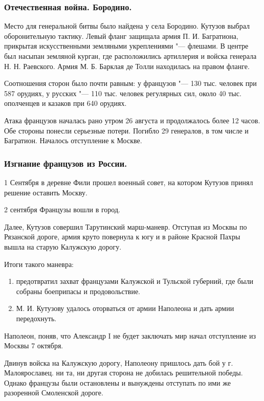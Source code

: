 \subsubsection{Отечественная война. Бородино.}

Место для генеральной битвы было найдена у села Бородино. Кутузов выбрал оборонительную тактику. Левый фланг защищала армия П. И. Багратиона, прикрытая искусственными земляными укреплениями "--- флешами. В центре был насыпан земляной курган, где расположились артиллерия и войска генерала Н. Н. Раевского. Армия М. Б. Барклая де Толли находилась на правом фланге.

Соотношения сторон было почти равным: у французов "--- 130 тыс. человек при 587 орудиях, у русских "--- 110 тыс. человек регулярных сил, около 40 тыс. ополченцев и казаков при 640 орудиях.

Атака французов началась рано утром 26 августа и продолжалось более 12 часов. Обе стороны понесли серьезные потери. Погибло 29 генералов, в том числе и Багратион. Началось отступление к Москве.

\subsubsection{Изгнание французов из России.}

1 Сентября в деревне Фили прошел военный совет, на котором Кутузов принял решение оставить Москву.

2 сентября Французы вошли в город.

Далее, Кутузов совершил Тарутинский марш-маневр. Отступая из Москвы по Рязанской дороге, армия круто повернула к югу и в районе Красной Пахры вышла на старую Калужскую дорогу.

Итоги такого маневра:

\begin{enumerate}
    \item{ предотвратил захват французами Калужской и Тульской губерний, где были собраны боеприпасы и продовольствие. }
    \item{ М. И. Кутузову удалось оторваться от армии Наполеона и дать армии передохнуть. }
\end{enumerate}

Наполеон, поняв, что Александр I не будет заключать мир начал отступление из Москвы 7 октября.

Двинув войска на Калужскую дорогу, Наполеону пришлось дать бой у г. Малоярославец. ни та, ни другая сторона не добилась решительной победы. Однако французы были остановлены и вынуждены отступать по ими же разоренной Смоленской дороге.

